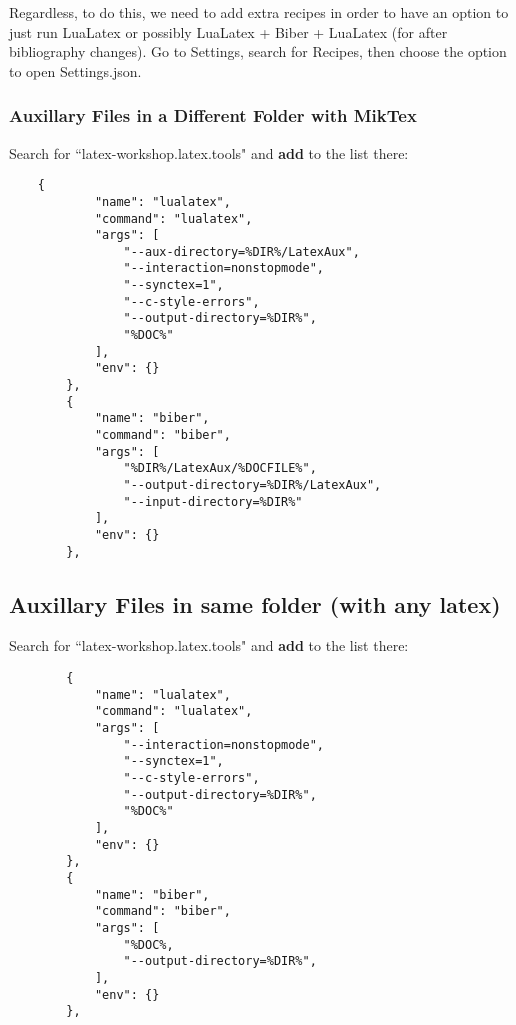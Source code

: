 \documentclass{article}
\begin{document}
Regardless, to do this, we need to add extra recipes in order to have an option to just run LuaLatex or possibly LuaLatex + Biber + LuaLatex (for after bibliography changes).
Go to Settings, search for Recipes, then choose the option to open Settings.json.

\subsubsection{Auxillary Files in a Different Folder with MikTex}
Search for ``latex-workshop.latex.tools" and \textbf{add} to the list there:
\begin{samepage}
    \begin{verbatim}
    {
            "name": "lualatex",
            "command": "lualatex",
            "args": [
                "--aux-directory=%DIR%/LatexAux",
                "--interaction=nonstopmode",
                "--synctex=1",
                "--c-style-errors",
                "--output-directory=%DIR%",
                "%DOC%"
            ],
            "env": {}
        },
        {
            "name": "biber",
            "command": "biber",
            "args": [
                "%DIR%/LatexAux/%DOCFILE%",
                "--output-directory=%DIR%/LatexAux",
                "--input-directory=%DIR%"
            ],
            "env": {}
        },
\end{verbatim}
\end{samepage}
\subsection{Auxillary Files in same folder (with any latex)}
Search for ``latex-workshop.latex.tools" and \textbf{add} to the list there:
\begin{samepage}
    \begin{verbatim}
        {
            "name": "lualatex",
            "command": "lualatex",
            "args": [
                "--interaction=nonstopmode",
                "--synctex=1",
                "--c-style-errors",
                "--output-directory=%DIR%",
                "%DOC%"
            ],
            "env": {}
        },
        {
            "name": "biber",
            "command": "biber",
            "args": [
                "%DOC%,
                "--output-directory=%DIR%",
            ],
            "env": {}
        },
\end{verbatim}
\end{samepage}
\end{document}
